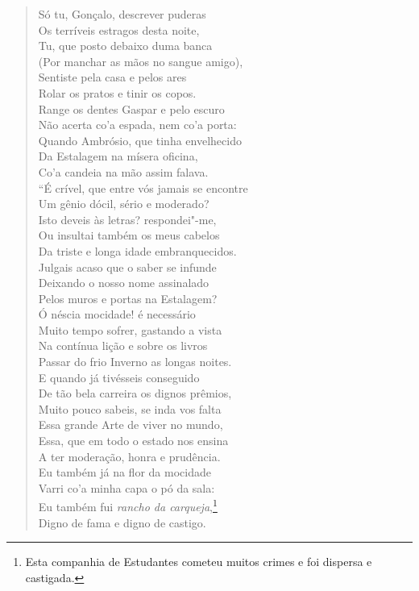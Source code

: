 \begin{verse}
Só tu, Gonçalo, descrever puderas\\
Os terríveis estragos desta noite,\\
Tu, que posto debaixo duma banca\\
(Por manchar as mãos no sangue amigo),\\
Sentiste pela casa e pelos ares\\
Rolar os pratos e tinir os copos.\\
Range os dentes Gaspar e pelo escuro\\
Não acerta co'a espada, nem co'a porta:\\
Quando Ambrósio, que tinha envelhecido\\
Da Estalagem na mísera oficina,\\
Co'a candeia na mão assim falava.\\
``É crível, que entre vós jamais se encontre\\
Um gênio dócil, sério e moderado?\\
Isto deveis às letras? respondei"-me,\\
Ou insultai também os meus cabelos\\
Da triste e longa idade embranquecidos.\\
Julgais acaso que o saber se infunde\\
Deixando o nosso nome assinalado\\
Pelos muros e portas na Estalagem?\\
Ó néscia mocidade! é necessário\\
Muito tempo sofrer, gastando a vista\\
Na contínua lição e sobre os livros\\
Passar do frio Inverno as longas noites.\\
E quando já tivésseis conseguido\\
De tão bela carreira os dignos prêmios,\\
Muito pouco sabeis, se inda vos falta\\
Essa grande Arte de viver no mundo,\\
Essa, que em todo o estado nos ensina\\
A ter moderação, honra e prudência.\\
Eu também já na flor da mocidade\\
Varri co'a minha capa o pó da sala:\\
Eu também fui \textit{rancho da carqueja},\footnote{ Esta companhia de Estudantes cometeu muitos crimes e foi dispersa e castigada.}\\
Digno de fama e digno de castigo.\\

\end{verse}
